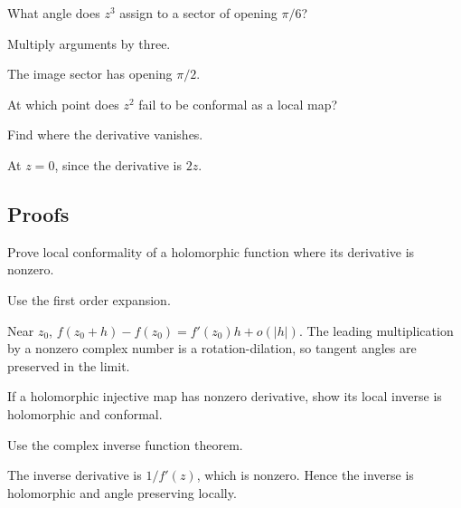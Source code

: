 \begin{exercise}\label{exr:iv17-expand-04}
What angle does \(z^3\) assign to a sector of opening \(\pi/6\)?
\end{exercise}
\begin{hint}
Multiply arguments by three.
\end{hint}
\begin{solution}
The image sector has opening \(\pi/2\).
\end{solution}

\begin{exercise}\label{exr:iv17-expand-05}
At which point does \(z^2\) fail to be conformal as a local map?
\end{exercise}
\begin{hint}
Find where the derivative vanishes.
\end{hint}
\begin{solution}
At \(z=0\), since the derivative is \(2z\).
\end{solution}

\subsection*{Proofs}

\begin{exercise}\label{exr:iv17-expand-06}
Prove local conformality of a holomorphic function where its derivative is nonzero.
\end{exercise}
\begin{hint}
Use the first order expansion.
\end{hint}
\begin{solution}
Near \(z_0\), \(f(z_0+h)-f(z_0)=f'(z_0)h+o(|h|)\). The leading multiplication by a nonzero complex number is a rotation-dilation, so tangent angles are preserved in the limit.
\end{solution}

\begin{exercise}\label{exr:iv17-expand-07}
If a holomorphic injective map has nonzero derivative, show its local inverse is holomorphic and conformal.
\end{exercise}
\begin{hint}
Use the complex inverse function theorem.
\end{hint}
\begin{solution}
The inverse derivative is \(1/f'(z)\), which is nonzero. Hence the inverse is holomorphic and angle preserving locally.
\end{solution}

